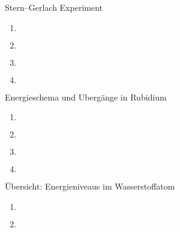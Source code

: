 \documentclass{alex_hü}
\begin{document}
\renewcommand{\labelenumi}{\alph{enumi})}


\begin{mybox}{Stern–Gerlach Experiment}
	\centering \(  \)
	\tcblower
	\begin{enumerate}
		\item \(  \)
%			
	\tcbline
		\item \(  \)
%		
	\tcbline
		\item \(  \)
%			
	\tcbline
		\item \(  \)
	\end{enumerate}
\end{mybox}

\begin{mybox}{Energieschema und Ubergänge in Rubidium}
	\centering \(  \)
	\tcblower
	\begin{enumerate}
		\item \(  \)
	\tcbline
		\item \(  \)
	\tcbline
		\item \(  \)
	\tcbline
		\item \(  \)
	\end{enumerate}
\end{mybox}

\begin{mybox}{Übersicht: Energieniveaus im Wasserstoffatom}
	\centering \(  \)
	\tcblower
	\begin{enumerate}
		\item \(  \)
	\tcbline
		\item \(  \)
	\end{enumerate}
\end{mybox}
\end{document}
